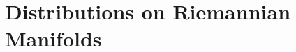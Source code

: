 \begin{comment}
    We have
    \[ \frac{\partial^N K_t(x,y)}{\partial t^N} = (2 \pi i)^N \int (\phi_1(x,y,\xi) - \phi_0(x,y,\xi))^N a(x,y,\xi) e^{2 \pi i \phi_t(x,y,\xi)}\; d\xi. \]
    Now $(\phi_1 - \phi_0)^N \cdot a$ is a symbol of order $r + N$. But on the other hand, using the fact that $(\phi_1 - \phi_0)^N \lesssim |x - y|^{2N} |\xi|^N$, and thus vanishes to order $2N$ on the diagonal, then combined with the fact that $|\nabla_\xi \phi(x,y,\xi)| \gtrsim |x - y|$, we actually see via an integration by parts $2N$ times in $\xi$ that we can rewrite the integral in terms of a symbol of order $r - N$ and the same phase $\phi_t$. Applying Taylor's theorem, we write
    \[ K(x,y) = K_1(x,y) = \sum_{k = 0}^{N-1} \frac{1}{k!} \left. \frac{\partial^k K_t(x,y)}{\partial t^k} \right|_{t = 1} + \frac{1}{N!} \int_0^1 t^{N-1} \frac{d^NK_t(x,y)}{dt^N}\; dt. \]
    This integral gives an arbitrarily smooth kernel as $N \to \infty$. Thus if we let $T$ be a pseudodifferential operator of order $r$ such that
    \[ T \sim \sum_{k = 0}^\infty \frac{1}{k!} \left. \frac{\partial^k K_t(x,y)}{\partial t^k} \right|_{t = 1}, \]
    then $T - S$ is a smoothing operator. Now if $\tilde{T}$ is the pseudodifferential operator corresponding to the symbol $a(x,x,\xi)$, then $T - \tilde{T}$, and thus $S - \tilde{T}$, is a pseudodifferential operator of order $r-1$. The converse is similar, working in the opposite direction, i.e. from $t = 1$ to $t = 0$, and is left as an exercise.
\end{proof}
\end{comment}

%
%









\chapter{Distributions on Riemannian Manifolds}

